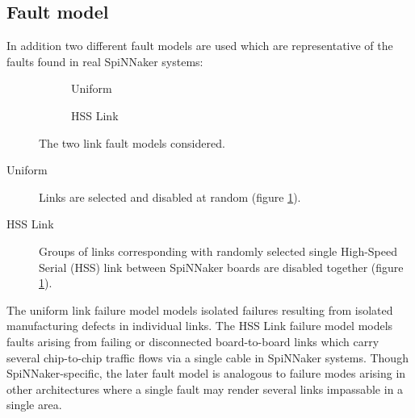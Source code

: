 		\subsection{Fault model}
			
			In addition two different fault models are used which are representative of
			the faults found in real SpiNNaker systems:
			
			\begin{figure}
				\center
				\begin{subfigure}{0.48\linewidth}
					\hspace*{-1.5cm}
					
					\caption{Uniform}
					\label{fig:fault-example-uniform}
				\end{subfigure}
				\begin{subfigure}{0.48\linewidth}
					\hspace*{-1.5cm}
					
					\caption{HSS Link}
					\label{fig:fault-example-hss}
				\end{subfigure}
				
				\caption{The two link fault models considered.}
				\label{fig:fault-example}
			\end{figure}
			
			\begin{description}
				
				\item[Uniform] Links are selected and disabled at random (figure
				\ref{fig:fault-example-uniform}).
				
				\item[HSS Link] Groups of links corresponding with randomly selected
				single High-Speed Serial (HSS) link between SpiNNaker boards are disabled
				together (figure \ref{fig:fault-example-uniform}).
				
			\end{description}
			
			The uniform link failure model models isolated failures resulting from
			isolated manufacturing defects in individual links. The HSS Link failure
			model models faults arising from failing or disconnected board-to-board
			links which carry several chip-to-chip traffic flows via a single cable in
			SpiNNaker systems. Though SpiNNaker-specific, the later fault model is
			analogous to failure modes arising in other architectures where a single
			fault may render several links impassable in a single area.
			
